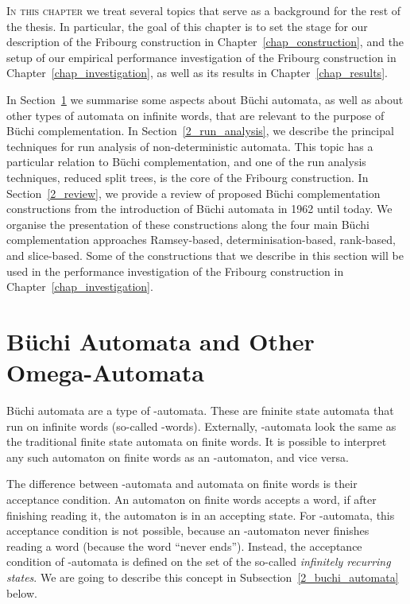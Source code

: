 \lettrine{I}{n this chapter} we treat several topics that serve as a background for the rest of the thesis. In particular, the goal of this chapter is to set the stage for our description of the Fribourg construction in Chapter~\ref{chap_construction}, and the setup of our empirical performance investigation of the Fribourg construction in Chapter~\ref{chap_investigation}, as well as its results in Chapter~\ref{chap_results}.

In Section~\ref{2_automata} we summarise some aspects about Büchi automata, as well as about other types of automata on infinite words, that are relevant to the purpose of Büchi complementation. In Section~\ref{2_run_analysis}, we describe the principal techniques for run analysis of non-deterministic automata. This topic has a particular relation to Büchi complementation, and one of the run analysis techniques, reduced split trees, is the core of the Fribourg construction. In Section~\ref{2_review}, we provide a review of proposed Büchi complementation constructions from the introduction of Büchi automata in 1962 until today. We organise the presentation of these constructions along the four main Büchi complementation approaches Ramsey-based, determinisation-based, rank-based, and slice-based. Some of the constructions that we describe in this section will be used in the performance investigation of the Fribourg construction in Chapter~\ref{chap_investigation}.

\section{Büchi Automata and Other Omega-Automata}
\label{2_automata}
Büchi automata are a type of \om-automata. These are fninite state automata that run on infinite words (so-called \om-words). Externally, \om-automata look the same as the traditional finite state automata on finite words. It is possible to interpret any such automaton on finite words as an \om-automaton, and vice versa.

The difference between \om-automata and automata on finite words is their acceptance condition. An automaton on finite words accepts a word, if after finishing reading it, the automaton is in an accepting state. For \om-automata, this acceptance condition is not possible, because an \om-automaton never finishes reading a word (because the word ``never ends''). Instead, the acceptance condition of \om-automata is defined on the set of the so-called \textit{infinitely recurring states}. We are going to describe this concept in Subsection~\ref{2_buchi_automata} below. 

